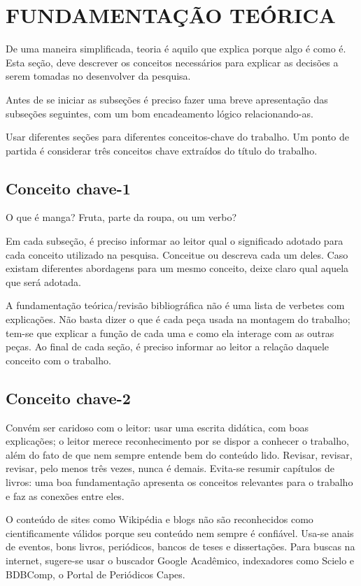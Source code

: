 \section{FUNDAMENTAÇÃO TEÓRICA}

De uma maneira simplificada, teoria é aquilo que explica porque algo é como é. Esta seção, deve descrever os conceitos necessários para explicar as decisões a serem tomadas no desenvolver da pesquisa.

Antes de se iniciar as subseções é preciso fazer uma breve apresentação das subseções seguintes, com um bom encadeamento lógico relacionando-as.

Usar diferentes seções para diferentes conceitos-chave do trabalho. Um ponto de partida é considerar três conceitos chave extraídos do título do trabalho.

\subsection{Conceito chave-1}

O que é manga? Fruta, parte da roupa, ou um verbo?

Em cada subseção, é preciso informar ao leitor qual o significado adotado para cada conceito utilizado na pesquisa. Conceitue ou descreva cada um deles. Caso existam diferentes abordagens para um mesmo conceito, deixe claro qual aquela que será adotada.

A fundamentação teórica/revisão bibliográfica não é uma lista de verbetes com explicações. Não basta dizer o que é cada peça usada na montagem do trabalho; tem-se que explicar a função de cada uma e como ela interage com as outras peças. Ao final de cada seção, é preciso informar ao leitor a relação daquele conceito com o trabalho. 

\subsection{Conceito chave-2}

Convém ser caridoso com o leitor: usar uma escrita didática, com boas explicações; o leitor merece reconhecimento por se dispor a conhecer o trabalho, além do fato de que nem sempre entende bem do conteúdo lido.  Revisar, revisar, revisar, pelo menos três vezes, nunca é demais. Evita-se resumir capítulos de livros: uma boa fundamentação apresenta os conceitos relevantes para o trabalho e faz as conexões entre eles. 

O conteúdo de sites como Wikipédia e blogs não são reconhecidos como cientificamente válidos porque seu conteúdo nem sempre é confiável. Usa-se anais de eventos, bons livros, periódicos, bancos de teses e dissertações. Para buscas na internet, sugere-se usar o buscador Google Acadêmico, indexadores como Scielo e BDBComp, o Portal de Periódicos Capes.

